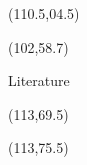 \documentclass[final]{beamer}
\begin{document}
\begin{frame}{}
\begin{textblock}{8}(110.5,04.5)

\end{textblock}

\begin{textblock}{15.5}(102,58.7)
\begin{block}{Literature}
\tiny


\end{block}
\end{textblock}

\begin{textblock}{10}(113,69.5)
\end{textblock}
\begin{textblock}{10}(113,75.5)
\end{textblock}

\end{frame}
\end{document}
